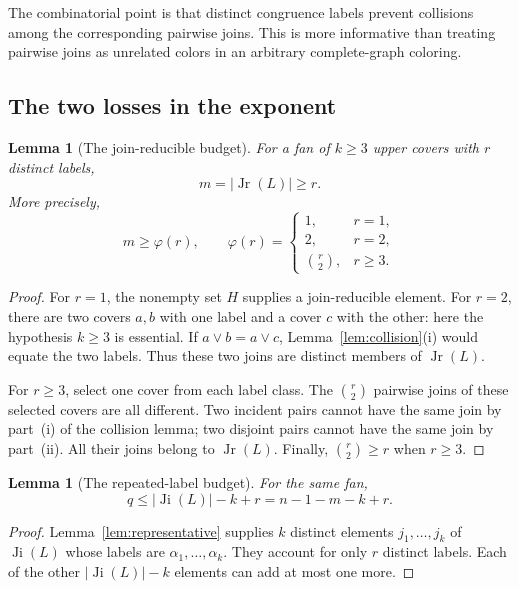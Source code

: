 \documentclass[11pt,a4paper]{article}
\numberwithin{equation}{section}
\newtheorem{lemma}[theorem]{Lemma}
\theoremstyle{definition}
\theoremstyle{remark}
\DeclareMathOperator{\Ji}{Ji}
\DeclareMathOperator{\Jr}{Jr}
\newcommand{\card}[1]{\lvert #1\rvert}
\begin{document}
The combinatorial point is that distinct congruence labels prevent collisions
among the corresponding pairwise joins. This is more informative than treating
pairwise joins as unrelated colors in an arbitrary complete-graph coloring.

\subsection{The two losses in the exponent}
\begin{lemma}[The join-reducible budget]\label{lem:budget}
For a fan of $k\ge3$ upper covers with $r$ distinct labels,
\begin{equation}\label{eq:budget}
 m=\card{\Jr(L)}\ge r.
\end{equation}
More precisely,
\begin{equation}\label{eq:phi}
 m\ge\varphi(r),\qquad
 \varphi(r)=
 \begin{cases}
 1,&r=1,\\
 2,&r=2,\\
 \binom r2,&r\ge3.
 \end{cases}
\end{equation}
\end{lemma}
\begin{proof}
For $r=1$, the nonempty set $H$ supplies a join-reducible element.
For $r=2$, there are two covers $a,b$ with one label and a cover $c$ with the
other: here the hypothesis $k\ge3$ is essential. If $a\vee b=a\vee c$,
Lemma~\ref{lem:collision}(i) would equate the two labels.
Thus these two joins are distinct members of $\Jr(L)$.

For $r\ge3$, select one cover from each label class.
The $\binom r2$ pairwise joins of these selected covers are all different.
Two incident pairs cannot have the same join by part~(i) of the collision lemma;
two disjoint pairs cannot have the same join by part~(ii).
All their joins belong to $\Jr(L)$.
Finally, $\binom r2\ge r$ when $r\ge3$.
\end{proof}

\begin{lemma}[The repeated-label budget]\label{lem:duplicates}
For the same fan,
\begin{equation}\label{eq:duplicates}
 q\le\card{\Ji(L)}-k+r=n-1-m-k+r.
\end{equation}
\end{lemma}
\begin{proof}
Lemma~\ref{lem:representative} supplies $k$ distinct elements
$j_1,\ldots,j_k$ of $\Ji(L)$ whose labels are $\alpha_1,\ldots,\alpha_k$.
They account for only $r$ distinct labels. Each of the other
$\card{\Ji(L)}-k$ elements can add at most one more.
\end{proof}
\end{document}
